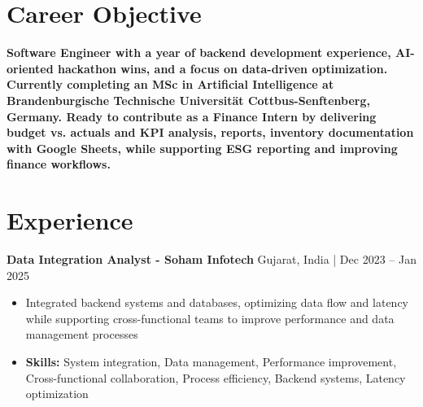 \documentclass[a4paper,11pt]{article}
\begin{document}
\vspace{-7mm}

\section{\textbf{Career Objective}}
\vspace{1mm}

\textbf{Software Engineer with a year of backend development experience, AI-oriented hackathon wins, and a focus on data-driven optimization. Currently completing an MSc in Artificial Intelligence at Brandenburgische Technische Universität Cottbus-Senftenberg, Germany. Ready to contribute as a Finance Intern by delivering budget vs. actuals and KPI analysis, reports, inventory documentation with Google Sheets, while supporting ESG reporting and improving finance workflows.}
\section{\textbf{Experience}}


\vspace{1mm}
  \textbf{Data Integration Analyst - Soham Infotech} \hfill Gujarat, India | Dec 2023 -- Jan 2025
\vspace{-1.5mm} %
\begin{itemize}
  \item Integrated backend systems and databases, optimizing data flow and latency while supporting cross-functional teams to improve performance and data management processes


\vspace{-2mm}
  \item \textbf{Skills:} System integration, Data management, Performance improvement, Cross-functional collaboration, Process efficiency, Backend systems, Latency optimization
\end{itemize}
\end{document}
